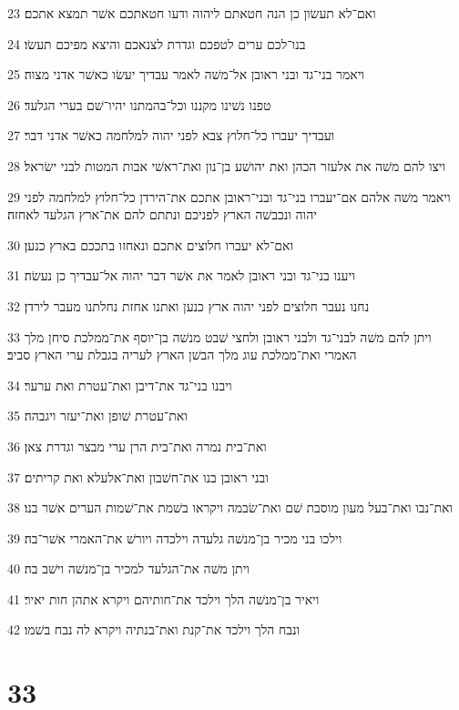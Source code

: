 \par 23 ואם־לא תעשׂון כן הנה חטאתם ליהוה ודעו חטאתכם אשׁר תמצא אתכם׃
\par 24 בנו־לכם ערים לטפכם וגדרת לצנאכם והיצא מפיכם תעשׂו׃
\par 25 ויאמר בני־גד ובני ראובן אל־משׁה לאמר עבדיך יעשׂו כאשׁר אדני מצוה׃
\par 26 טפנו נשׁינו מקננו וכל־בהמתנו יהיו־שׁם בערי הגלעד׃
\par 27 ועבדיך יעברו כל־חלוץ צבא לפני יהוה למלחמה כאשׁר אדני דבר׃
\par 28 ויצו להם משׁה את אלעזר הכהן ואת יהושׁע בן־נון ואת־ראשׁי אבות המטות לבני ישׂראל׃
\par 29 ויאמר משׁה אלהם אם־יעברו בני־גד ובני־ראובן אתכם את־הירדן כל־חלוץ למלחמה לפני יהוה ונכבשׁה הארץ לפניכם ונתתם להם את־ארץ הגלעד לאחזה׃
\par 30 ואם־לא יעברו חלוצים אתכם ונאחזו בתככם בארץ כנען׃
\par 31 ויענו בני־גד ובני ראובן לאמר את אשׁר דבר יהוה אל־עבדיך כן נעשׂה׃
\par 32 נחנו נעבר חלוצים לפני יהוה ארץ כנען ואתנו אחזת נחלתנו מעבר לירדן׃
\par 33 ויתן להם משׁה לבני־גד ולבני ראובן ולחצי שׁבט מנשׁה בן־יוסף את־ממלכת סיחן מלך האמרי ואת־ממלכת עוג מלך הבשׁן הארץ לעריה בגבלת ערי הארץ סביב׃
\par 34 ויבנו בני־גד את־דיבן ואת־עטרת ואת ערער׃
\par 35 ואת־עטרת שׁופן ואת־יעזר ויגבהה׃
\par 36 ואת־בית נמרה ואת־בית הרן ערי מבצר וגדרת צאן׃
\par 37 ובני ראובן בנו את־חשׁבון ואת־אלעלא ואת קריתים׃
\par 38 ואת־נבו ואת־בעל מעון מוסבת שׁם ואת־שׂבמה ויקראו בשׁמת את־שׁמות הערים אשׁר בנו׃
\par 39 וילכו בני מכיר בן־מנשׁה גלעדה וילכדה ויורשׁ את־האמרי אשׁר־בה׃
\par 40 ויתן משׁה את־הגלעד למכיר בן־מנשׁה וישׁב בה׃
\par 41 ויאיר בן־מנשׁה הלך וילכד את־חותיהם ויקרא אתהן חות יאיר׃
\par 42 ונבח הלך וילכד את־קנת ואת־בנתיה ויקרא לה נבח בשׁמו׃

\chapter{33}


